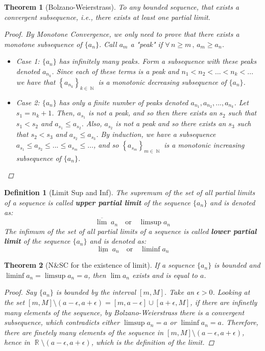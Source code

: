 \documentclass[12pt]{article}
\newcommand{\Forall}[1]{\forall\,{#1}\,,\,}
\newcommand{\seq}[2]{\left\{{#1}\right\}_{#2 \in\N}}
\DeclareMathOperator{\N}{\mathbb{N}}
\DeclareMathOperator{\R}{\mathbb{R}}
\newtheorem{theorem}{Theorem}[subsection]
\newtheorem{definition}{Definition}[subsection]
\begin{document}
\begin{theorem}[Bolzano-Weierstrass]
  To any bounded sequence, that exists a convergent subsequence, i.e., there exists at least one partial limit.
  \begin{proof}
    By Monotone Convergence, we only need to prove that there exists a monotone subsequence of $\{a_n\}$. Call $a_m$ a "peak" if $\Forall{n\geq m}a_m\geq a_n$. 
    \begin{itemize}
      \item[] Case 1: $\{a_n\}$ has infinitely many peaks. Form a subsequence with these peaks denoted $a_{n_k}$. Since each of these terms is a peak and $n_1<n_2<...<n_k<...$ we have that $\seq{a_{n_k}}{k}$ is a monotonic decreasing subsequence of $\{a_n\}$.
      \item[] Case 2: $\{a_n\}$ has only a finite number of peaks denoted $a_{n_1},a_{n_2},...,a_{n_k}$. Let $s_1=n_k+1$. Then, $a_{s_1}$ is not a peak, and so then there exists an $s_2$ such that $s_1<s_2$ and $a_{s_1}\leq a_{s_2}$. Also, $a_{s_2}$ is not a peak and so there exists an $s_3$ such that $s_2<s_3$ and $a_{s_2}\leq a_{s_3}$. By induction, we have a subsequence $a_{s_1}\leq a_{s_2}\leq ...\leq a_{s_m}\leq ...$, and so $\seq{a_{s_m}}{m}$ is a monotonic increasing subsequence of $\{a_n\}$.
    \end{itemize}
  \end{proof}
\end{theorem}

\begin{definition}[Limit Sup and Inf]
  The supremum of the set of all partial limits of a sequence is called \textbf{upper partial limit} of the sequence $\{a_n\}$ and is denoted as:
  $$\overline{\lim}\;a_n\quad\text{or}\quad\limsup a_n$$
  The infimum of the set of all partial limits of a sequence is called \textbf{lower partial limit} of the sequence $\{a_n\}$ and is denoted as:
  $$\underline{\lim}\;a_n\quad\text{or}\quad\liminf a_n$$
\end{definition}

\begin{theorem}[N\&SC for the existence of limit]
  If a sequence $\{a_n\}$ is bounded and $\liminf a_n=\limsup a_n = a$, then $\lim a_n$ exists and is equal to $a$.
  \begin{proof}
    Say $\{a_n\}$ is bounded by the interval $[m,M]$. Take an $\epsilon>0$. Looking at the set $[m,M]\setminus(a-\epsilon,a+\epsilon)=[m,a-\epsilon]\cup[a+\epsilon,M]$, if there are infinetly many elements of the sequence, by Bolzano-Weierstrass there is a convergent subsequence, which contradicts either $\limsup a_n = a$ or $\liminf a_n = a$. Therefore, there are finetely many elements of the sequence in $[m,M]\setminus(a-\epsilon,a+\epsilon)$, hence in $\R\setminus(a-\epsilon,a+\epsilon)$, which is the definition of the limit.
  \end{proof}
\end{theorem}
\end{document}
